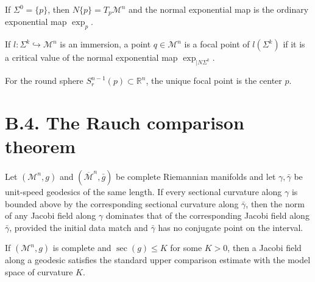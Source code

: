 \begin{example}
\label{appb-ex-normal-bundle-point}
If $\Sigma^0=\{p\}$, then $N\{p\}=T_p\mathcal M^n$ and the normal exponential map is the ordinary exponential map $\exp_p$.
\end{example}

\begin{definition}
\label{appb-def-focal-point}
If $l:\Sigma^k\hookrightarrow\mathcal M^n$ is an immersion, a point $q\in\mathcal M^n$ is a focal point of $l(\Sigma^k)$ if it is a critical value of the normal exponential map $\exp_{\mid N\Sigma^k}$.
\end{definition}

\begin{example}
\label{appb-ex-euclidean-sphere-focal-point}
For the round sphere $S_r^{n-1}(p)\subset\mathbb R^n$, the unique focal point is the center $p$.
\end{example}

\section*{B.4. The Rauch comparison theorem}

\begin{theorem}
\label{appb-thm-rauch-comparison}
Let $(\mathcal M^n,g)$ and $(\overline{\mathcal M}^n,\bar g)$ be complete Riemannian manifolds and let $\gamma,\bar\gamma$ be unit-speed geodesics of the same length. If every sectional curvature along $\gamma$ is bounded above by the corresponding sectional curvature along $\bar\gamma$, then the norm of any Jacobi field along $\gamma$ dominates that of the corresponding Jacobi field along $\bar\gamma$, provided the initial data match and $\bar\gamma$ has no conjugate point on the interval.
\end{theorem}

\begin{corollary}
\label{appb-cor-rauch-nonpositive-model}
If $(\mathcal M^n,g)$ is complete and $\sec(g)\le K$ for some $K>0$, then a Jacobi field along a geodesic satisfies the standard upper comparison estimate with the model space of curvature $K$.
\end{corollary}

